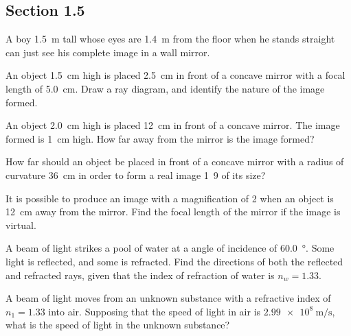 \documentclass[a4paper]{exam}
\begin{document}
  \subsection*{Section 1.5}
  \begin{questions}
    \question A boy \SI{1.5}{\metre} tall whose eyes are \SI{1.4}{\metre} from the floor when he stands
              straight can just see his complete image in a wall mirror.

    \question An object \SI{1.5}{\centi\metre} high is placed \SI{2.5}{\centi\metre} in front of
              a concave mirror with a focal length of \SI{5.0}{\centi\metre}. Draw a ray diagram,
              and identify the nature of the image formed.

    \question An object \SI{2.0}{\centi\metre} high is placed \SI{12}{\centi\metre} in front of
              a concave mirror. The image formed is \SI{1}{\centi\metre} high. How far away from
              the mirror is the image formed?

    \question How far should an object be placed in front of a concave mirror with a radius of
              curvature \SI{36}{\centi\metre} in order to form a real image \SI{1}{9} of its size?

    \question It is possible to produce an image with a magnification of 2 when an object is \SI{12}{\centi\metre}
              away from the mirror. Find the focal length of the mirror if the image is virtual.

    \question A beam of light strikes a pool of water at a angle of incidence of \SI{60.0}{\degree}. Some light is
              reflected, and some is refracted. Find the directions of both the reflected and refracted rays, given
              that the index of refraction of water is $ n_w = 1.33 $.

    \question A beam of light moves from an unknown substance with a refractive index of $ n_1 = 1.33 $ into air. Supposing that the
              speed of light in air is $ \SI{2.99e8}{\metre\per\second} $, what is the speed of light in the unknown substance?


\end{questions}
\end{document}

